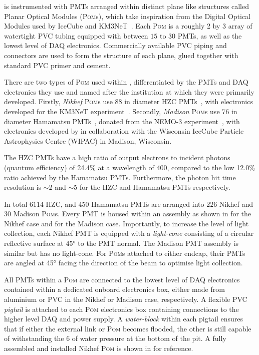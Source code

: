 \chipsfive is instrumented with PMTs arranged within distinct plane like structures called Planar
Optical Modules (\textsc{Pom}s), which take inspiration from the Digital Optical Modules used by
IceCube and KM3NeT~\cite{hanson2006, eijk2015}. Each \textsc{Pom} is a roughly \SI{2}{} by
\SI{3}{} array of watertight PVC tubing equipped with between $15$ to $30$ PMTs, as well
as the lowest level of DAQ electronics. Commercially available PVC piping and connectors are used
to form the structure of each plane, glued together with standard PVC primer and cement.

There are two types of \textsc{Pom} used within \chipsfive, differentiated by the PMTs and DAQ
electronics they use and named after the institution at which they were primarily developed.
Firstly, \emph{Nikhef} \textsc{Pom}s use \SI{88}{} in diameter HZC PMTs~\cite{hzc}, with
electronics developed for the KM3NeT experiment~\cite{katz2009, adrian2016}. Secondly,
\emph{Madison} \textsc{Pom}s use \SI{76}{} in diameter Hamamatsu PMTs~\cite{hamamatsu},
donated from the NEMO-3 experiment~\cite{arnold2005}, with electronics developed by \chips in
collaboration with the Wisconsin IceCube Particle Astrophysics Centre (WIPAC) in Madison,
Wisconsin.

The HZC PMTs have a high ratio of output electrons to incident photons (quantum efficiency) of
24.4\% at a wavelength of \SI{400}{}, compared to the low 12.0\% ratio achieved by the
Hamamatsu PMTs. Furthermore, the photon hit time resolution is $\sim$\SI{2}{} and
$\sim$\SI{5}{} for the HZC and Hamamatsu PMTs respectively.

In total $6114$ HZC, and $450$ Hamamatsu PMTs are arranged into $226$ Nikhef and $30$ Madison
\textsc{Pom}s. Every PMT is housed within an assembly as shown in
 for the Nikhef case and 
for the Madison case. Importantly, to increase the level of light collection, each Nikhef PMT is
equipped with a \emph{light-cone} consisting of a circular reflective surface at \ang{45} to the
PMT normal. The Madison PMT assembly is similar but has no light-cone. For \textsc{Pom}s attached
to either endcap, their PMTs are angled at \ang{45} facing the direction of the beam to optimise
light collection.

All PMTs within a \textsc{Pom} are connected to the lowest level of DAQ electronics contained
within a dedicated onboard electronics box, either made from aluminium or PVC in the Nikhef or
Madison case, respectively. A flexible PVC \emph{pigtail} is attached to each \textsc{Pom}
electronics box containing connections to the higher level DAQ and power supply. A
\emph{water-block} within each pigtail ensures that if either the external link or \textsc{Pom}
becomes flooded, the other is still capable of withstanding the \SI{6}{} of water
pressure at the bottom of the pit. A fully assembled and installed Nikhef \textsc{Pom} is shown in
 for reference.

